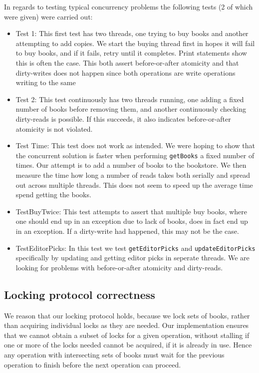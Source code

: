 In regards to testing typical concurrency problems the following tests (2 of which were given) were carried out:
\begin{itemize}
    \item Test 1: This first test has two threads, one trying to buy books and another attempting to add copies. We start the buying thread first in hopes it will fail to buy books, and if it fails, retry until it completes. Print statements show this is often the case. This both assert before-or-after atomicity and that dirty-writes does not happen since both operations are write operations writing to the same
    \item Test 2: This test continuously has two threads running, one adding a fixed number of books before removing them, and another continuously checking dirty-reads is possible. If this succeeds, it also indicates before-or-after atomicity is not violated.
    \item Test Time: This test does not work as intended. We were hoping to show that the concurrent solution is faster when performing {\tt getBooks} a fixed number of times. Our attempt is to add a number of books to the bookstore. We then measure the time how long a number of reads takes both serially and spread out across multiple threads. This does not seem to speed up the average time spend getting the books.
    \item TestBuyTwice: This test attempts to assert that multiple buy books, where one should end up in an exception due to lack of books, does in fact end up in an exception. If a dirty-write had happened, this may not be the case.
    \item TestEditorPicks: In this test we test {\tt getEditorPicks} and {\tt updateEditorPicks} specifically by updating and getting editor picks in seperate threads. We are looking for problems with before-or-after atomicity and dirty-reads.
\end{itemize}

\subsection{Locking protocol correctness}
We reason that our locking protocol holds, because we lock sets of books, rather
than acquiring individual locks as they are needed. Our implementation ensures
that we cannot obtain a subset of locks for a given operation, without stalling
if one or more of the locks needed cannot be acquired, if it is already in use.
Hence any operation with intersecting sets of books must wait for the previous
operation to finish before the next operation can proceed.

